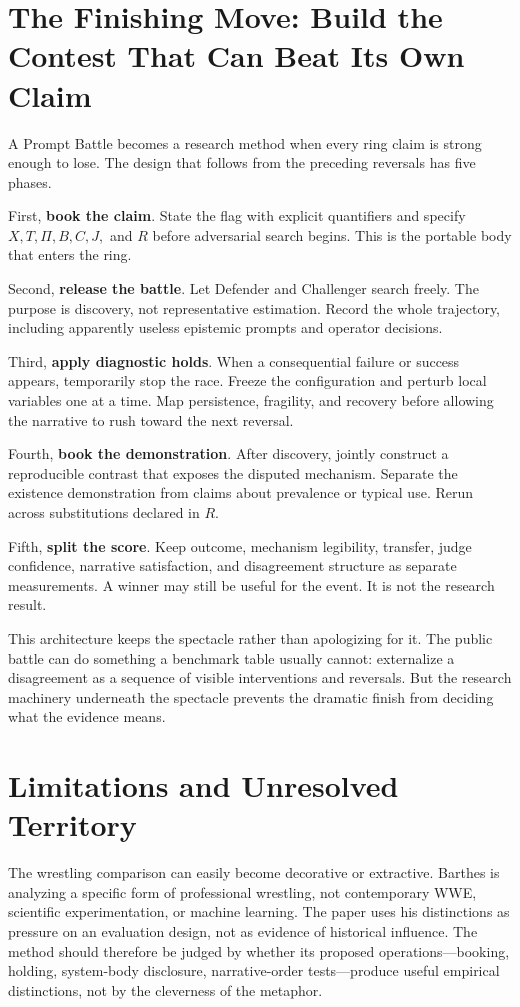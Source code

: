 \documentclass[11pt]{article}
\begin{document}
\section{The Finishing Move: Build the Contest That Can Beat Its Own Claim}
A Prompt Battle becomes a research method when every ring claim is strong enough to lose. The design that follows from the preceding reversals has five phases.

First, \textbf{book the claim}. State the flag with explicit quantifiers and specify $X,T,\Pi,B,C,J,$ and $R$ before adversarial search begins. This is the portable body that enters the ring.

Second, \textbf{release the battle}. Let Defender and Challenger search freely. The purpose is discovery, not representative estimation. Record the whole trajectory, including apparently useless epistemic prompts and operator decisions.

Third, \textbf{apply diagnostic holds}. When a consequential failure or success appears, temporarily stop the race. Freeze the configuration and perturb local variables one at a time. Map persistence, fragility, and recovery before allowing the narrative to rush toward the next reversal.

Fourth, \textbf{book the demonstration}. After discovery, jointly construct a reproducible contrast that exposes the disputed mechanism. Separate the existence demonstration from claims about prevalence or typical use. Rerun across substitutions declared in $R$.

Fifth, \textbf{split the score}. Keep outcome, mechanism legibility, transfer, judge confidence, narrative satisfaction, and disagreement structure as separate measurements. A winner may still be useful for the event. It is not the research result.

This architecture keeps the spectacle rather than apologizing for it. The public battle can do something a benchmark table usually cannot: externalize a disagreement as a sequence of visible interventions and reversals. But the research machinery underneath the spectacle prevents the dramatic finish from deciding what the evidence means.

\section{Limitations and Unresolved Territory}
The wrestling comparison can easily become decorative or extractive. Barthes is analyzing a specific form of professional wrestling, not contemporary WWE, scientific experimentation, or machine learning. The paper uses his distinctions as pressure on an evaluation design, not as evidence of historical influence. The method should therefore be judged by whether its proposed operations---booking, holding, system-body disclosure, narrative-order tests---produce useful empirical distinctions, not by the cleverness of the metaphor.
\end{document}
